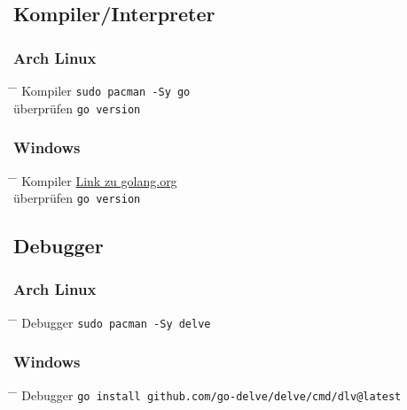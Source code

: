 \documentclass[twoside,a4paper,12pt]{article}
\begin{document}
\subsection{Kompiler/Interpreter}
\subsubsection{Arch Linux}
\begin{tabbing}
  \hspace{2mm} \= \hspace{30mm} \= \kill
  \> Kompiler \> \verb|sudo pacman -Sy go| \\ 
  \> überprüfen \> \verb|go version| \\
\end{tabbing}
\subsubsection{Windows}
\begin{tabbing}
  \hspace{2mm} \= \hspace{30mm} \= \kill
  \> Kompiler \> \href{https://go.dev/doc/install}{Link zu golang.org} \\
  \> überprüfen \> \verb|go version| \\
\end{tabbing}
\subsection{Debugger}
\subsubsection{Arch Linux}
\begin{tabbing}
  \hspace{2mm} \= \hspace{30mm} \= \kill
  \> Debugger \> \verb|sudo pacman -Sy delve| \\
\end{tabbing}
\subsubsection{Windows}
\begin{tabbing}
  \hspace{2mm} \= \hspace{30mm} \= \kill
  \> Debugger \> \verb|go install github.com/go-delve/delve/cmd/dlv@latest| \\
\end{tabbing}
\end{document}
